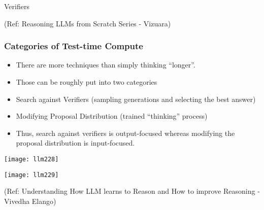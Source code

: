 \begin{frame}[fragile]\frametitle{}
\begin{center}
{\Large Verifiers}

{\tiny (Ref:  Reasoning LLMs from Scratch Series - Vizuara)}

\end{center}

\end{frame}

\begin{frame}[fragile]\frametitle{Categories of Test-time Compute}
      \begin{itemize}
        \item There are more techniques than simply thinking “longer”.
		\item Those can be roughly put into two categories
		\item Search against Verifiers (sampling generations and selecting the best answer)
		\item Modifying Proposal Distribution (trained “thinking” process)
		\item Thus, search against verifiers is output-focused whereas modifying the proposal distribution is input-focused.
      \end{itemize}
	  
        \begin{center}
        \texttt{[image: llm228]}
		
        \texttt{[image: llm229]}
		
		{\tiny (Ref: Understanding How LLM learns to Reason and How to improve Reasoning - Vivedha Elango)}
        \end{center}		  
\end{frame}


